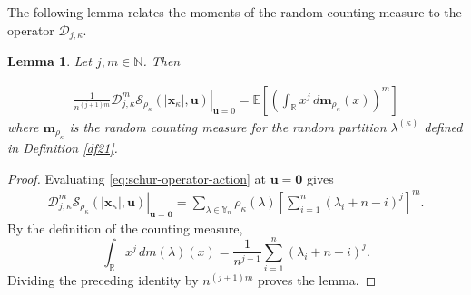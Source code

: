 \documentclass[11pt]{amsart}
\theoremstyle{plain}
\newtheorem{lemma}[theorem]{Lemma}
\newcommand\RR{{\mathbb R}}
\newcommand\NN{{\mathbb N}}
\newcommand\YY{{\mathbb {Y}}}
\numberwithin{equation}{section}
\numberwithin{theorem}{section}
\numberwithin{figure}{section}
\begin{document}
The following lemma relates the moments of the random counting measure to the operator $\mathcal{D}_{j,\kappa}$. 
\begin{lemma}\label{l04}Let $j,m\in\NN$. Then
 
  \begin{eqnarray*}
\left.\frac{1}{n^{(j+1)m}}\mathcal{D}_{j,\kappa}^m \mathcal{S}_{\rho_{\kappa}}(|\mathbf{x}_{\kappa}|,\mathbf{u})\right|_{\mathbf{u}=0}=\mathbb{E}\left[\left(\int_{\RR} x^{j}\,d\mathbf{m}_{\rho_{\kappa}}(x)\right)^m\right]
\end{eqnarray*} 
where $\mathbf{m}_{\rho_{\kappa}}$ is the random counting measure for the random partition $\lambda^{(\kappa)}$ defined in Definition \ref{df21}. 
\end{lemma}
\begin{proof}
Evaluating \eqref{eq:schur-operator-action} at $\mathbf{u}=\mathbf{0}$ gives
\begin{align*}
\left.\mathcal{D}_{j,\kappa}^{m}
\mathcal{S}_{\rho_{\kappa}}(|\mathbf{x}_{\kappa}|,\mathbf{u})
\right|_{\mathbf{u}=\mathbf{0}}
=
\sum_{\lambda\in\YY_n}\rho_{\kappa}(\lambda)
\left[\sum_{i=1}^{n}(\lambda_i+n-i)^j\right]^m.
\end{align*}
By the definition of the counting measure,
\[
\int_{\RR}x^j\,d m(\lambda)(x)
=
\frac{1}{n^{j+1}}\sum_{i=1}^{n}(\lambda_i+n-i)^j.
\]
Dividing the preceding identity by $n^{(j+1)m}$ proves the lemma.
\end{proof}
\end{document}
